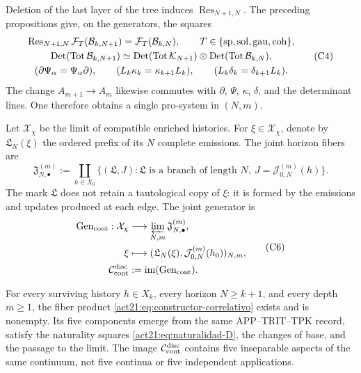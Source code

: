 Deletion of the last layer of the tree induces
\(\operatorname{Res}_{N+1,N}\). The preceding propositions give, on the
generators, the squares
\[
\begin{gathered}
 \operatorname{Res}_{N+1,N}\mathcal F_T(\mathcal B_{k,N+1})
 =\mathcal F_T(\mathcal B_{k,N}),
 \qquad T\in\{{\rm sp},{\rm sol},{\rm gau},{\rm coh}\},\\
 \operatorname{Det}(\operatorname{Tot}\mathcal B_{k,N+1})
 \simeq
 \operatorname{Det}(\operatorname{Tot}\mathcal K_{N+1})
 \otimes
 \operatorname{Det}(\operatorname{Tot}\mathcal B_{k,N}),\\
 (\partial\Psi_\alpha=\Psi_\alpha\partial),\qquad
 (L_k\kappa_k=\kappa_{k+1}L_k),\qquad
 (L_k\delta_k=\delta_{k+1}L_k).
\end{gathered}
 \tag{C4}
 \label{act21:eq:naturalidad-D}
\]
The change \(A_{m+1}\to A_m\) likewise commutes with \(\partial\), \(\Psi\),
\(\kappa\), \(\delta\), and the determinant lines. One therefore obtains
a single pro-system in \((N,m)\).

Let \(\mathcal X_\chi\) be the limit of compatible enriched histories. For
\(\xi\in\mathcal X_\chi\), denote by \(\mathfrak L_N(\xi)\) the ordered
prefix of its \(N\) complete emissions. The joint horizon fibers
are
\[
 \mathfrak J_{N,\bullet}^{(m)}
 :=\coprod_{h\in X_0}
 \{(\mathfrak L,J):\mathfrak L\text{ is a branch of length }N,
       \ J=\mathcal J_{0,N}^{(m)}(h)\}.
 \tag{C5}
 \label{act21:eq:fibras-conjuntas-horizonte}
\]
The mark \(\mathfrak L\) does not retain a tautological copy of \(\xi\): it is
formed by the emissions and updates produced at each edge. The
joint generator is
\[
\begin{aligned}
 \operatorname{Gen}_{\rm cont}:\mathcal X_\chi
   &\longrightarrow\varprojlim_{N,m}\mathfrak J_{N,\bullet}^{(m)},\\
 \xi&\longmapsto
   (\mathfrak L_N(\xi),\mathcal J_{0,N}^{(m)}(h_0))_{N,m},\\
 \mathcal C_{\rm cont}^{\rm disc}
   &:=\operatorname{im}(\operatorname{Gen}_{\rm cont}).
\end{aligned}
 \tag{C6}
 \label{act21:eq:continuo-discreto}
\]

\begin{theorem}
\label{act21:thm:correlacion-cinco}
For every surviving history \(h\in X_k\), every horizon
\(N\geq k+1\), and every depth \(m\geq1\), the fiber product
\eqref{act21:eq:constructor-correlativo} exists and is nonempty. Its five
components emerge from the same APP--TRIT--TPK record, satisfy the
naturality squares \eqref{act21:eq:naturalidad-D}, the changes of base, and the
passage to the limit. The image \(\mathcal C_{\rm cont}^{\rm disc}\) contains five
inseparable aspects of the same continuum, not five continua or five
independent applications.
\end{theorem}

